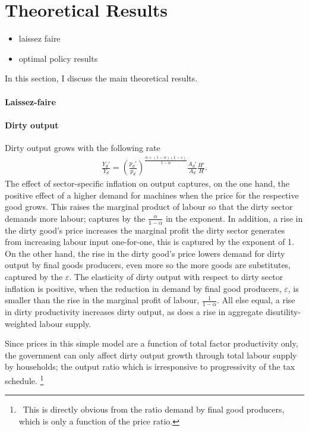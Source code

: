 \section{Theoretical Results}\label{sec:theory}
\begin{itemize}
	\item laissez faire
	\item optimal policy results
\end{itemize}

In this section, I discuss the main theoretical results. 

\paragraph{Laissez-faire}
\paragraph{Dirty output}

Dirty output grows with the following rate
\begin{align*}
	\frac{Y_d'}{Y_d}=\left(\frac{p_d'}{p_d}\right)^{\frac{\alpha+(1-\alpha)(1-\varepsilon)}{1-\alpha}}\frac{A_d'}{A_d}\frac{H'}{H}.
\end{align*}
The effect of sector-specific inflation on output captures, on the one hand, the positive effect of a higher demand for machines when the price for the respective good grows. This raises the marginal product of labour so that the dirty sector demands more labour; captures by the $\frac{\alpha}{1-\alpha}$ in the exponent. In addition,  a rise in the dirty good's price increases the marginal profit the dirty sector generates from increasing labour input one-for-one, this is captured by the exponent of 1. On the other hand,  the rise in the dirty good's price lowers demand for dirty output by final goods producers, even more so the more goods are substitutes, captured by the $\varepsilon$. The elasticity of dirty output with respect to dirty sector inflation is positive, when the reduction in demand by final good producers, $\varepsilon$,  is smaller than the rise in the marginal profit of labour, $\frac{1}{1-\alpha}$. 
All else equal, a rise in dirty productivity increases dirty output, as does a rise in aggregate disutility-weighted labour supply.

Since prices in this simple model are a function of total factor productivity only, the government can only affect dirty output growth through total labour supply by households; the output ratio which is irresponsive to progressivity of the tax schedule.%
\footnote{\ This is directly obvious from the ratio demand by final good producers, which is only a function of the price ratio. }



